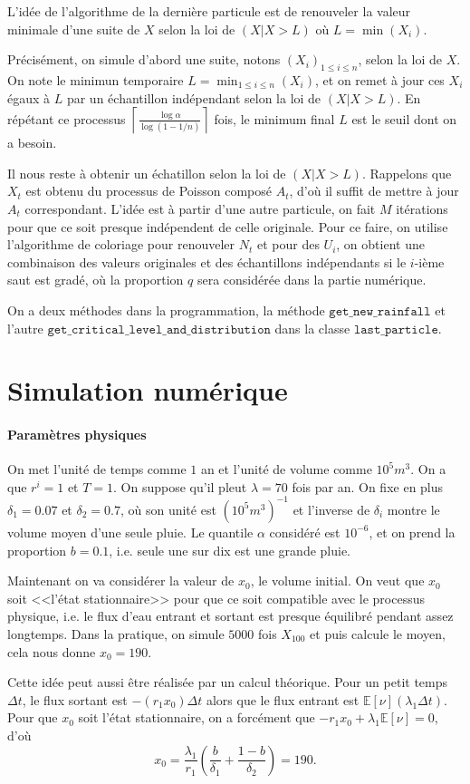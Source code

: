 \documentclass{article}
\begin{document}
L'idée de l'algorithme de la dernière particule est de renouveler la valeur minimale d'une suite de $X$ selon la loi de $(X|X>L)$ où $L=\min(X_i)$. 

Précisément, on simule d'abord une suite, notons $(X_i)_{1\leq i\leq n}$, selon la loi de $X$. On note le minimun temporaire $L=\min_{1\leq i\leq n}(X_i)$, et on remet à jour ces $X_i$ égaux à $L$ par un échantillon indépendant selon la loi de $(X|X>L)$. En répétant ce processus $\displaystyle \left\lceil\frac{\log \alpha}{\log(1-1/n)}\right\rceil$ fois, le minimum final $L$ est le seuil dont on a besoin.

Il nous reste à obtenir un échatillon selon la loi de $(X|X>L)$. Rappelons que $X_t$ est obtenu du processus de Poisson composé $A_t$, d'où il suffit de mettre à jour $A_t$ correspondant. L'idée est à partir d'une autre particule, on fait $M$ itérations pour que ce soit presque indépendent de celle originale. Pour ce faire, on utilise l'algorithme de coloriage pour renouveler $N_t$ et pour des $U_i$, on obtient une combinaison des valeurs originales et des échantillons indépendants si le $i$-ième saut est gradé, où la proportion $q$ sera considérée dans la partie numérique.

On a deux méthodes dans la programmation, la méthode $\texttt{get\_new\_rainfall}$ et l'autre $\texttt{get\_critical\_level\_and\_distribution}$ dans la classe $\texttt{last\_particle}$.

\section{Simulation numérique} 
\paragraph{Paramètres physiques} On met l'unité de temps comme $1$ an et l'unité de volume comme $10^5m^3$. On a que $r^i=1$ et $T=1$. On suppose qu'il pleut $\lambda=70$ fois par an. On fixe en plus $\delta_1=0.07$ et $\delta_2=0.7$, où son unité est $(10^5m^3)^{-1}$ et l'inverse de $\delta_i$ montre le volume moyen d'une seule pluie. Le quantile $\alpha$ considéré est $10^{-6}$, et on prend la proportion $b=0.1$, i.e. seule une sur dix est une grande pluie.

Maintenant on va considérer la valeur de $x_0$, le volume initial. On veut que $x_0$ soit <<l'état stationnaire>> pour que ce soit compatible avec le processus physique, i.e. le flux d'eau entrant et sortant est presque équilibré pendant assez longtemps. Dans la pratique, on simule $5000$ fois $X_{100}$ et puis calcule le moyen, cela nous donne $x_0=190$.

Cette idée peut aussi être réalisée par un calcul théorique. Pour un petit temps $\Delta t$, le flux sortant est $-(r_1 x_0)\Delta t$ alors que le flux entrant est $\mathbb E[\nu](\lambda_1\Delta t)$. Pour que $x_0$ soit l'état stationnaire, on a forcément que  $-r_1x_0+\lambda_1{\mathbb E[\nu]}=0$, d'où
\[x_0=\frac{\lambda_1}{r_1}\left(\frac{b}{\delta_1}+\frac{1-b}{\delta_2}\right)=190.\]
\end{document}

